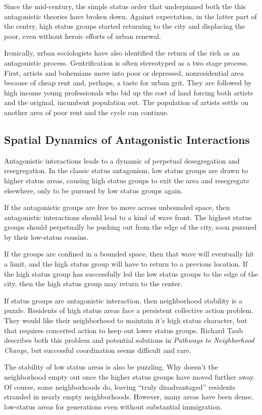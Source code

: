 Since the mid-century, the simple status order that underpinned both
the this antagonistic theories have broken down.  Against expectation,
in the latter part of the centry, high status groups started returning
to the city and displacing the poor, even without heroic efforts of
urban renewal.

Ironically, urban sociologists have also identified the return of the
rich as an antagonistic process. Gentrification is often stereotyped
as a two stage process. First, artists and bohemians move into poor or
depressed, nonresidential area because of cheap rent and, perhaps, a
taste for urban grit. They are followed by high income young
professionals who bid up the cost of land forcing both artists and the
original, incumbent population out. The population of artists settle
on another area of poor rent and the cycle can continue.\cite{ley_new_1997}

\subsection*{Spatial Dynamics of Antagonistic Interactions}
Antagonistic interactions leads to a dynamic of perpetual
desegregation and resegregation. In the classic status antagonism, low
status groups are drawn to higher status areas, causing high
status groups to exit the area and resegregate elsewhere, only to be
pursued by low status groups again.

If the antagonistic groups are free to move across unbounded space,
then antagonistic interactions should lead to a kind of wave
front. The highest status groups should perpetually be pushing out
from the edge of the city, soon pursued by their low-status cousins.

If the groups are confined in a bounded space, then that wave will
eventually hit a limit, and the high status group will have to return
to a previous location. If the high status group has successfully led
the low status groups to the edge of the city, then the high status
group may return to the center.

If status groups are antagonistic interaction, then neighborhood
stability is a puzzle. Residents of high status areas face a
persistent collective action problem. They would like their
neighborhood to maintain it's high status character, but that requires
concerted action to keep out lower status groups. Richard Taub
describes both this problem and potential solutions in \emph{Pathways
  to Neighborhood Change}, but successful coordination seems difficult
and rare.\cite{taub_paths_1987}

The stability of low status areas is also be puzzling. Why doesn't the
neighborhood empty out once the higher status groups have moved
further away. Of course, some neighborhoods do, leaving ``truly
disadvantaged'' residents stranded in nearly empty
neighborhoods.\cite{wilson_truly_1990} However, many areas have been dense,
low-status areas for generations even without substantial immigration.
